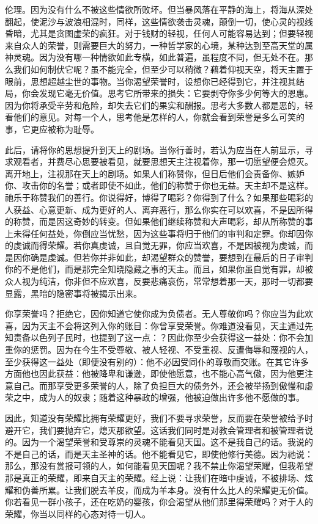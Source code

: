 伦理。因为没有什么不被这些情欲所败坏。但当暴风落在平静的海上，将海从深处翻起，使泥沙与波浪相混时，同样，这些情欲袭击灵魂，颠倒一切，使心灵的视线昏暗，尤其是贪图虚荣的疯狂。对于钱财的轻视，任何人可能容易达到；但要轻视来自众人的荣誉，则需要巨大的努力，一种哲学家的心境，某种达到至高天堂的属神灵魂。因为没有哪一种情欲如此专横，如此普遍，虽程度不同，但无处不在。那么我们如何制伏它呢？虽不能完全，但至少可以稍微？藉着仰视天空，将天主置于眼前，思想超越尘世的事物。当你渴望荣誉时，设想你已经得到它，并注视其结局，你会发现它毫无价值。思考它所带来的损失：它要剥夺你多少何等大的恩惠。因为你将承受辛劳和危险，却失去它们的果实和酬报。思考大多数人都是恶的，轻看他们的意见。对每一个人，思考他是怎样的人，你就会看到荣誉是多么可笑的事，它更应被称为耻辱。\par

此后，请将你的思想提升到天上的剧场。当你行善时，若认为应当在人前显示，寻求观看者，并费尽心思要被看见，就要思想天主注视着你，那一切愿望便会熄灭。离开地上，注视那在天上的剧场。如果人们称赞你，但日后他们会责备你、嫉妒你、攻击你的名誉；或者即使不如此，他们的称赞于你也无益。天主却不是这样。祂乐于称赞我们的善行。你说得好，博得了喝彩？你得到了什么？如果那些喝彩的人获益、心意更新、成为更好的人、离弃恶行，那么你实在可以欢喜，不是因所得的称赞，而是因这奇妙的转变。但如果他们继续称赞和大声喝彩，却从所称赞的事上未得任何益处，你倒应当忧愁，因为这些事将归于他们的审判和定罪。你却因你的虔诚而得荣耀。若你真虔诚，且自觉无罪，你应当欢喜，不是因被视为虔诚，而是因你确是虔诚。但若你并非如此，却渴望群众的赞誉，要想到在最后的日子审判你的不是他们，而是那完全知晓隐藏之事的天主。而且，如果你虽自觉有罪，却被众人视为纯洁，你非但不应欢喜，反要悲痛哀伤，常常想着那一天，那时一切都要显露，黑暗的隐密事将被揭示出来。\par

你享荣誉吗？拒绝它，因你知道它使你成为负债者。无人尊敬你吗？你应当为此欢喜，因为天主不会将这列入你的账目：你曾享受荣誉。你难道没看见，天主通过先知责备以色列子民时，也提到了这一点：？因此你至少会获得这一益处：你不会加重你的惩罚。因为在今生不受尊敬、被人轻视、不受重视、反遭侮辱和蔑视的人，至少获得这一益处（即便没有别的）：他不必因受同仆的尊敬而交账。在其它许多方面他也因此获益：他被降卑和谦逊，即使他愿意，也不能心高气傲，因为他更注意自己。而那享受更多荣誉的人，除了负担巨大的债务外，还会被举扬到傲慢和虚荣之中，成为人的奴隶；随着这种暴政的增强，他被迫做出许多他不愿做的事。\par

因此，知道没有荣耀比拥有荣耀更好，我们不要寻求荣誉，反而要在荣誉被给予时避开它，我们要抛弃它，熄灭那欲望。这话我们同时是对教会管理者和被管理者说的。因为一个渴望荣誉和受尊崇的灵魂不能看见天国。这不是我自己的话。我说的不是自己的话，而是天主圣神的话。他不能看见它，即使他修行美德。因为祂说：那么，那没有赏报可领的人，如何能看见天国呢？我不禁止你渴望荣耀，但我希望那是真正的荣耀，即来自天主的荣耀。经上说：让我们在暗中虔诚，不被排场、炫耀和伪善所累。让我们脱去羊皮，而成为羊本身。没有什么比人的荣耀更无价值。你若看见一群小孩子，还在吃奶的婴孩，你会渴望从他们那里得荣耀吗？对于人的荣耀，你当以同样的心态对待一切人。\par

